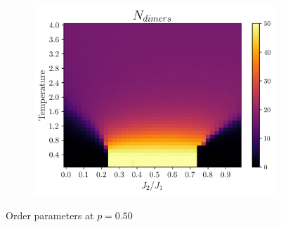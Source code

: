 \documentclass[../thesis_main.tex]{subfiles}
\begin{document}
\begin{figure}[!htb]
\begin{subfigure}[b]{0.43\textwidth}
        \centering
        \includegraphics[width=\textwidth]{images/j1-j2/phase_diagrams/p=0.50/N_dimers_p=0.50.png}
    \end{subfigure}
    \caption{Order parameters at $p = 0.50$}
    \label{p=0.50}
\end{figure}
\FloatBarrier
\end{document}
